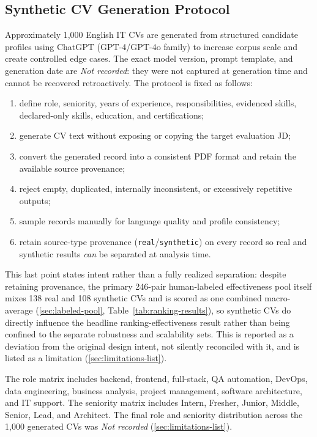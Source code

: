\documentclass[12pt,a4paper,oneside]{report}
\begin{document}
\subsection{Synthetic CV Generation Protocol}\label{sec:synthetic-protocol}
Approximately 1,000 English IT CVs are generated from structured candidate profiles using ChatGPT (GPT-4/GPT-4o family) to increase corpus scale and create controlled edge cases. The exact model version, prompt template, and generation date are \emph{Not recorded}: they were not captured at generation time and cannot be recovered retroactively. The protocol is fixed as follows:
\begin{enumerate}
  \item define role, seniority, years of experience, responsibilities, evidenced skills, declared-only skills, education, and certifications;
  \item generate CV text without exposing or copying the target evaluation JD;
  \item convert the generated record into a consistent PDF format and retain the available source provenance;
  \item reject empty, duplicated, internally inconsistent, or excessively repetitive outputs;
  \item sample records manually for language quality and profile consistency;
  \item retain source-type provenance (\texttt{real}/\texttt{synthetic}) on every record so real and synthetic results \emph{can} be separated at analysis time.
\end{enumerate}

This last point states intent rather than a fully realized separation: despite retaining provenance, the primary 246-pair human-labeled effectiveness pool itself mixes 138 real and 108 synthetic CVs and is scored as one combined macro-average (\cref{sec:labeled-pool}, Table~\ref{tab:ranking-results}), so synthetic CVs do directly influence the headline ranking-effectiveness result rather than being confined to the separate robustness and scalability sets. This is reported as a deviation from the original design intent, not silently reconciled with it, and is listed as a limitation (\cref{sec:limitations-list}).

The role matrix includes backend, frontend, full-stack, QA automation, DevOps, data engineering, business analysis, project management, software architecture, and IT support. The seniority matrix includes Intern, Fresher, Junior, Middle, Senior, Lead, and Architect. The final role and seniority distribution across the 1,000 generated CVs was \emph{Not recorded} (\cref{sec:limitations-list}).
\end{document}
